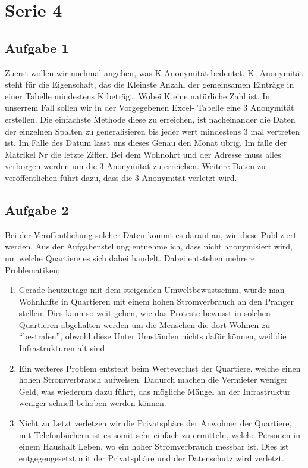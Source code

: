 \documentclass[10pt]{article}
\newcommand{\heading}[2]{\setcounter{section}{#2}\section*{#1 #2}}
\newcommand{\problem}[1]{\subsection{#1}}
\begin{document}
    \heading{Serie}{4}
    \problem{Aufgabe 1}
		Zuerst wollen wir nochmal angeben, was K-Anonymität bedeutet. K- Anonymität steht für die Eigenschaft, das die Kleinste Anzahl der gemeinsamen Einträge in einer Tabelle mindestens K beträgt. Wobei K eine natürliche Zahl ist. In unserrem Fall sollen wir in der Vorgegebenen Excel- Tabelle eine 3 Anonymität erstellen. Die einfachste Methode diese zu erreichen, ist nacheinander die Daten der einzelnen Spalten zu generalisieren bis jeder wert mindestens 3 mal vertreten ist. Im Falle des Datum lässt uns dieses Genau den Monat übrig. Im falle der Matrikel Nr die letzte Ziffer. Bei dem Wohnohrt und der Adresse muss alles verborgen werden um die 3 Anonymität zu erreichen. Weitere Daten zu veröffentlichen führt dazu, dass die 3-Anonymität verletzt wird.

    \problem{Aufgabe 2}
	Bei der Veröffentlichung solcher Daten kommt es darauf an, wie diese Publiziert werden. Aus der Aufgabenstellung entnehme ich, dass nicht anonymisiert wird, um welche Quartiere es sich dabei handelt. Dabei entstehen mehrere Problematiken:
	\begin{enumerate}
	 \item Gerade heutzutage mit dem steigenden Umweltbewustseinm, würde man Wohnhafte in Quartieren mit einem hohen Stromverbrauch an den Pranger stellen. Dies kann so weit gehen, wie das Proteste bewusst in solchen Quartieren abgehalten werden um die Menschen die dort Wohnen zu ``bestrafen'', obwohl diese Unter Umständen nichts dafür können, weil die Infrastrukturen alt sind.
	 \item Ein weiteres Problem entsteht beim Werteverlust der Quartiere, welche einen hohen Stromverbrauch aufweisen. Dadurch machen die Vermieter weniger Geld, was wiederum dazu führt, das mögliche Mängel an der Infrastruktur weniger schnell behoben werden können.
	 \item Nicht zu Letzt verletzen wir die Privatsphäre der Anwohner der Quartiere, mit Telefonbüchern ist es somit sehr einfach zu ermitteln, welche Personen in einem Haushalt Leben, wo ein hoher Stromverbrauch messbar ist. Dies ist entgegengesetzt mit der Privatsphäre und der Datenschutz wird verletzt.
	\end{enumerate}
\end{document}
